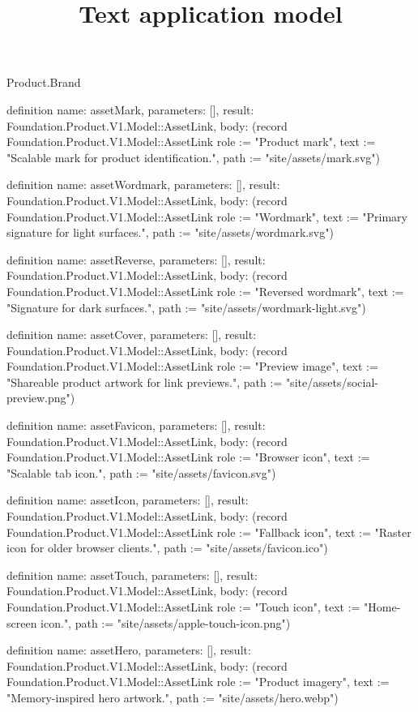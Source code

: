 \begin{lexlean}{Product.Brand}
\title{Text application model}
\begin{semanticmodule}
definition{
  name: assetMark, parameters: [], result: Foundation.Product.V1.Model::AssetLink,
  body: (record Foundation.Product.V1.Model::AssetLink {role := "Product mark", text := "Scalable mark for product identification.", path := "site/assets/mark.svg"})
}

definition{
  name: assetWordmark, parameters: [], result: Foundation.Product.V1.Model::AssetLink,
  body: (record Foundation.Product.V1.Model::AssetLink {role := "Wordmark", text := "Primary signature for light surfaces.", path := "site/assets/wordmark.svg"})
}

definition{
  name: assetReverse, parameters: [], result: Foundation.Product.V1.Model::AssetLink,
  body: (record Foundation.Product.V1.Model::AssetLink {role := "Reversed wordmark", text := "Signature for dark surfaces.", path := "site/assets/wordmark-light.svg"})
}

definition{
  name: assetCover, parameters: [], result: Foundation.Product.V1.Model::AssetLink,
  body: (record Foundation.Product.V1.Model::AssetLink {role := "Preview image", text := "Shareable product artwork for link previews.", path := "site/assets/social-preview.png"})
}

definition{
  name: assetFavicon, parameters: [], result: Foundation.Product.V1.Model::AssetLink,
  body: (record Foundation.Product.V1.Model::AssetLink {role := "Browser icon", text := "Scalable tab icon.", path := "site/assets/favicon.svg"})
}

definition{
  name: assetIcon, parameters: [], result: Foundation.Product.V1.Model::AssetLink,
  body: (record Foundation.Product.V1.Model::AssetLink {role := "Fallback icon", text := "Raster icon for older browser clients.", path := "site/assets/favicon.ico"})
}

definition{
  name: assetTouch, parameters: [], result: Foundation.Product.V1.Model::AssetLink,
  body: (record Foundation.Product.V1.Model::AssetLink {role := "Touch icon", text := "Home-screen icon.", path := "site/assets/apple-touch-icon.png"})
}

definition{
  name: assetHero, parameters: [], result: Foundation.Product.V1.Model::AssetLink,
  body: (record Foundation.Product.V1.Model::AssetLink {role := "Product imagery", text := "Memory-inspired hero artwork.", path := "site/assets/hero.webp"})
}


\end{semanticmodule}
\end{lexlean}
